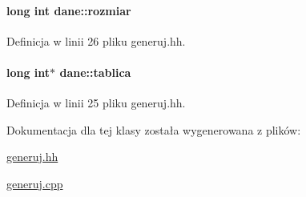 \paragraph[{rozmiar}]{\setlength{\rightskip}{0pt plus 5cm}long int dane\+::rozmiar\hspace{0.3cm}{\ttfamily [private]}}\label{classdane_abc9b63b1b2caa22fd4c71a8504d01ae6}


Definicja w linii 26 pliku generuj.\+hh.

\hypertarget{classdane_a99cb90f61c23e390b594c688bd52ebf5}{}
\paragraph[{tablica}]{\setlength{\rightskip}{0pt plus 5cm}long int$\ast$ dane\+::tablica\hspace{0.3cm}{\ttfamily [private]}}\label{classdane_a99cb90f61c23e390b594c688bd52ebf5}


Definicja w linii 25 pliku generuj.\+hh.



Dokumentacja dla tej klasy została wygenerowana z plików\+:\begin{DoxyCompactItemize}
\item 
\hyperlink{generuj_8hh}{generuj.\+hh}\item 
\hyperlink{generuj_8cpp}{generuj.\+cpp}\end{DoxyCompactItemize}
